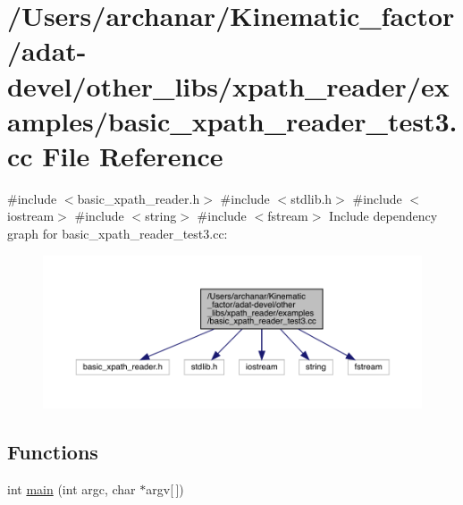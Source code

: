 \hypertarget{adat-devel_2other__libs_2xpath__reader_2examples_2basic__xpath__reader__test3_8cc}{}\section{/\+Users/archanar/\+Kinematic\+\_\+factor/adat-\/devel/other\+\_\+libs/xpath\+\_\+reader/examples/basic\+\_\+xpath\+\_\+reader\+\_\+test3.cc File Reference}
\label{adat-devel_2other__libs_2xpath__reader_2examples_2basic__xpath__reader__test3_8cc}
{\ttfamily \#include $<$basic\+\_\+xpath\+\_\+reader.\+h$>$}\newline
{\ttfamily \#include $<$stdlib.\+h$>$}\newline
{\ttfamily \#include $<$iostream$>$}\newline
{\ttfamily \#include $<$string$>$}\newline
{\ttfamily \#include $<$fstream$>$}\newline
Include dependency graph for basic\+\_\+xpath\+\_\+reader\+\_\+test3.\+cc\+:
\nopagebreak
\begin{figure}[H]
\begin{center}
\leavevmode
\includegraphics[width=350pt]{dd/de3/adat-devel_2other__libs_2xpath__reader_2examples_2basic__xpath__reader__test3_8cc__incl}
\end{center}
\end{figure}
\subsection*{Functions}
\begin{DoxyCompactItemize}
\item 
int \mbox{\hyperlink{adat-devel_2other__libs_2xpath__reader_2examples_2basic__xpath__reader__test3_8cc_a0ddf1224851353fc92bfbff6f499fa97}{main}} (int argc, char $\ast$argv\mbox{[}$\,$\mbox{]})
\end{DoxyCompactItemize}


